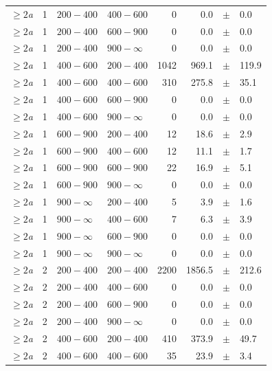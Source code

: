 \begin{table}[!h]
\begin{tabular}{rrllrrcl}
$\geq 2${\it a} & 1 & $ 200- 400$ & $400-600$ &      0 &      0.0 &$\pm$&    0.0 \\
$\geq 2${\it a} & 1 & $ 200- 400$ & $600-900$ &      0 &      0.0 &$\pm$&    0.0 \\
$\geq 2${\it a} & 1 & $ 200- 400$ & $900-\infty$ &      0 &      0.0 &$\pm$&    0.0 \\
$\geq 2${\it a} & 1 & $ 400- 600$ & $200-400$ &   1042 &    969.1 &$\pm$&  119.9 \\
$\geq 2${\it a} & 1 & $ 400- 600$ & $400-600$ &    310 &    275.8 &$\pm$&   35.1 \\
$\geq 2${\it a} & 1 & $ 400- 600$ & $600-900$ &      0 &      0.0 &$\pm$&    0.0 \\
$\geq 2${\it a} & 1 & $ 400- 600$ & $900-\infty$ &      0 &      0.0 &$\pm$&    0.0 \\
$\geq 2${\it a} & 1 & $ 600- 900$ & $200-400$ &     12 &     18.6 &$\pm$&    2.9 \\
$\geq 2${\it a} & 1 & $ 600- 900$ & $400-600$ &     12 &     11.1 &$\pm$&    1.7 \\
$\geq 2${\it a} & 1 & $ 600- 900$ & $600-900$ &     22 &     16.9 &$\pm$&    5.1 \\
$\geq 2${\it a} & 1 & $ 600- 900$ & $900-\infty$ &      0 &      0.0 &$\pm$&    0.0 \\
$\geq 2${\it a} & 1 & $ 900- \infty$ & $200-400$ &      5 &      3.9 &$\pm$&    1.6 \\
$\geq 2${\it a} & 1 & $ 900- \infty$ & $400-600$ &      7 &      6.3 &$\pm$&    3.9 \\
$\geq 2${\it a} & 1 & $ 900- \infty$ & $600-900$ &      0 &      0.0 &$\pm$&    0.0 \\
$\geq 2${\it a} & 1 & $ 900- \infty$ & $900-\infty$ &      0 &      0.0 &$\pm$&    0.0 \\
$\geq 2${\it a} & 2 & $ 200- 400$ & $200-400$ &   2200 &   1856.5 &$\pm$&  212.6 \\
$\geq 2${\it a} & 2 & $ 200- 400$ & $400-600$ &      0 &      0.0 &$\pm$&    0.0 \\
$\geq 2${\it a} & 2 & $ 200- 400$ & $600-900$ &      0 &      0.0 &$\pm$&    0.0 \\
$\geq 2${\it a} & 2 & $ 200- 400$ & $900-\infty$ &      0 &      0.0 &$\pm$&    0.0 \\
$\geq 2${\it a} & 2 & $ 400- 600$ & $200-400$ &    410 &    373.9 &$\pm$&   49.7 \\
$\geq 2${\it a} & 2 & $ 400- 600$ & $400-600$ &     35 &     23.9 &$\pm$&    3.4 \\

\end{tabular}
\end{table}
